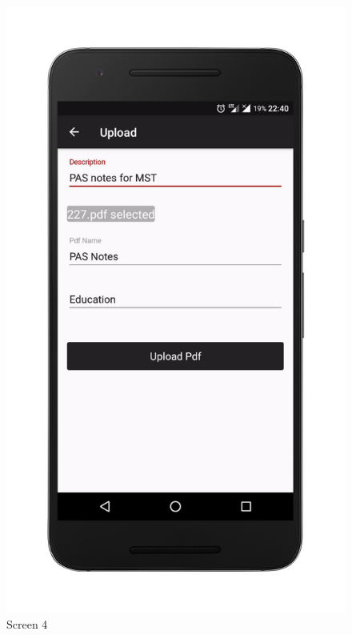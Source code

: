 \begin{figure}[ht]
\centering
\includegraphics[scale=0.13]{images/up.png}
\caption{Screen 4}
\end{figure}

\newpage


